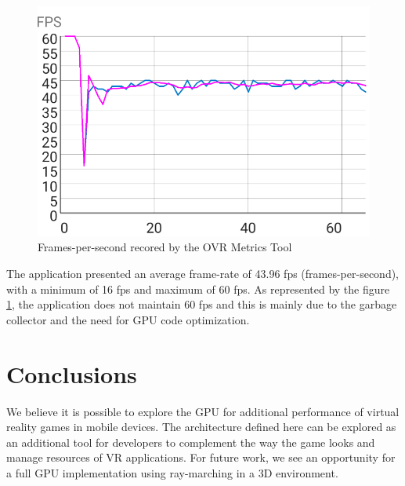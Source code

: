 \documentclass[runningheads]{llncs}
\begin{document}
\begin{figure}[h]
\centering
\includegraphics[width=\textwidth]{src/hci2020-images/VRPerformance.png}
\caption{Frames-per-second recored by the OVR Metrics Tool}
\label{fig:VRPerformanceChart}
\end{figure}

The application presented an average frame-rate of 43.96 fps (frames-per-second), with a minimum of 16 fps and maximum of 60 fps. As represented by the figure \ref{fig:VRPerformanceChart}, the application does not maintain 60 fps and this is mainly due to the garbage collector and the need for GPU code optimization.


\section{Conclusions}
We believe it is possible to explore the GPU for additional performance of virtual reality games in mobile devices. The architecture defined here can be explored as an additional tool for developers to complement the way the game looks and manage resources of VR applications. For future work, we see an opportunity for a full GPU implementation using ray-marching in a 3D environment.
%
%
%


\end{document}
